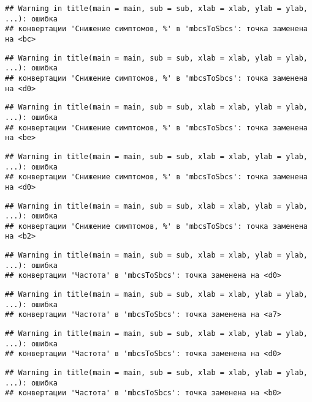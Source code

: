 \documentclass[
]{article}
\begin{document}
\begin{verbatim}
## Warning in title(main = main, sub = sub, xlab = xlab, ylab = ylab, ...): ошибка
## конвертации 'Снижение симптомов, %' в 'mbcsToSbcs': точка заменена на <bc>
\end{verbatim}

\begin{verbatim}
## Warning in title(main = main, sub = sub, xlab = xlab, ylab = ylab, ...): ошибка
## конвертации 'Снижение симптомов, %' в 'mbcsToSbcs': точка заменена на <d0>
\end{verbatim}

\begin{verbatim}
## Warning in title(main = main, sub = sub, xlab = xlab, ylab = ylab, ...): ошибка
## конвертации 'Снижение симптомов, %' в 'mbcsToSbcs': точка заменена на <be>
\end{verbatim}

\begin{verbatim}
## Warning in title(main = main, sub = sub, xlab = xlab, ylab = ylab, ...): ошибка
## конвертации 'Снижение симптомов, %' в 'mbcsToSbcs': точка заменена на <d0>
\end{verbatim}

\begin{verbatim}
## Warning in title(main = main, sub = sub, xlab = xlab, ylab = ylab, ...): ошибка
## конвертации 'Снижение симптомов, %' в 'mbcsToSbcs': точка заменена на <b2>
\end{verbatim}

\begin{verbatim}
## Warning in title(main = main, sub = sub, xlab = xlab, ylab = ylab, ...): ошибка
## конвертации 'Частота' в 'mbcsToSbcs': точка заменена на <d0>
\end{verbatim}

\begin{verbatim}
## Warning in title(main = main, sub = sub, xlab = xlab, ylab = ylab, ...): ошибка
## конвертации 'Частота' в 'mbcsToSbcs': точка заменена на <a7>
\end{verbatim}

\begin{verbatim}
## Warning in title(main = main, sub = sub, xlab = xlab, ylab = ylab, ...): ошибка
## конвертации 'Частота' в 'mbcsToSbcs': точка заменена на <d0>
\end{verbatim}

\begin{verbatim}
## Warning in title(main = main, sub = sub, xlab = xlab, ylab = ylab, ...): ошибка
## конвертации 'Частота' в 'mbcsToSbcs': точка заменена на <b0>
\end{verbatim}
\end{document}

